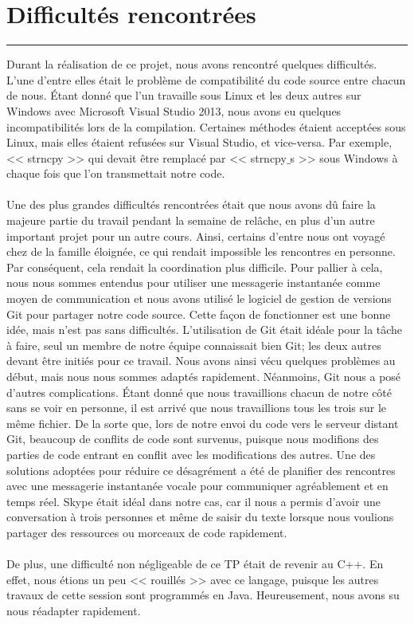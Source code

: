 \documentclass[10pt,letterpaper]{article}
\begin{document}
\newpage
\section{Difficultés rencontrées}
\hrule
\vspace{1em}
Durant la réalisation de ce projet, nous avons rencontré quelques difficultés. 
L’une d’entre elles était le problème de compatibilité du code source entre chacun de nous. 
Étant donné que l’un travaille sous Linux et les deux autres sur Windows avec Microsoft Visual Studio 2013, 
nous avons eu quelques incompatibilités lors de la compilation. 
Certaines méthodes étaient acceptées sous Linux, mais elles étaient refusées sur Visual Studio, et vice-versa. 
Par exemple, << strncpy >> qui devait être remplacé par << strncpy$\_$s >> sous Windows à chaque fois que l’on transmettait notre code.\\
\\
Une des plus grandes difficultés rencontrées était que nous avons dû faire la majeure partie du travail pendant la semaine de relâche, 
en plus d'un autre important projet pour un autre cours. 
Ainsi, certains d’entre nous ont voyagé chez de la famille éloignée, ce qui rendait impossible les rencontres en personne. 
Par conséquent, cela rendait la coordination plus difficile. 
Pour pallier à cela, nous nous sommes entendus pour utiliser une messagerie instantanée comme moyen de communication 
et nous avons utilisé le logiciel de gestion de versions Git pour partager notre code source. 
Cette façon de fonctionner est une bonne idée, mais n’est pas sans difficultés. 
L’utilisation de Git était idéale pour la tâche à faire, seul un membre de notre équipe connaissait bien Git; les deux autres devant être initiés pour ce travail. 
Nous avons ainsi vécu quelques problèmes au début, mais nous nous sommes adaptés rapidement. 
Néanmoins, Git nous a posé d’autres complications. 
Étant donné que nous travaillions chacun de notre côté sans se voir en personne, il est arrivé que nous travaillions tous les trois sur le même fichier. 
De la sorte que, lors de notre envoi du code vers le serveur distant Git, beaucoup de conflits de code sont survenus, 
puisque nous modifions des parties de code entrant en conflit avec les modifications des autres. 
Une des solutions adoptées pour réduire ce désagrément a été de planifier des rencontres avec une 
messagerie instantanée vocale pour communiquer agréablement et en temps réel. 
Skype était idéal dans notre cas, car il nous a permis d’avoir une conversation à trois personnes et même de 
saisir du texte lorsque nous voulions partager des ressources ou morceaux de code rapidement.\\
\\
De plus, une difficulté non négligeable de ce TP était de revenir au C++. 
En effet, nous étions un peu << rouillés >> avec ce langage, puisque les autres travaux de cette session sont programmés en Java. 
Heureusement, nous avons su nous réadapter rapidement.
\end{document}

